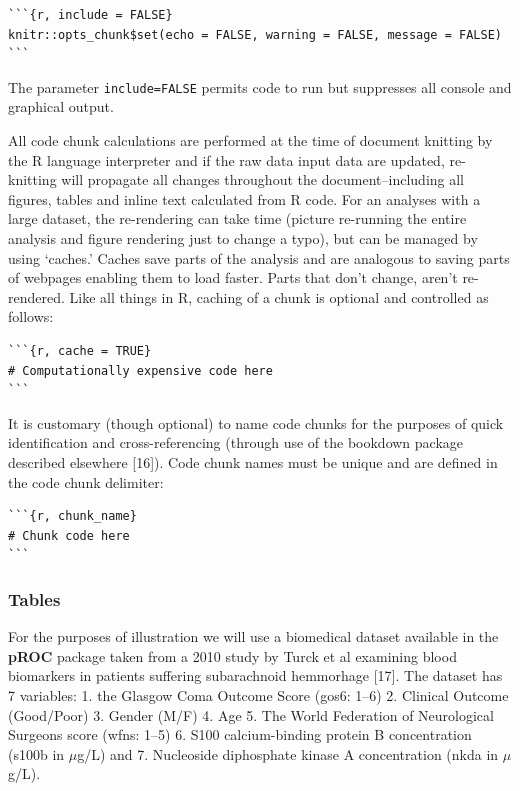 \documentclass[]{elsarticle} %
\begin{document}
\begin{verbatim}
```{r, include = FALSE}
knitr::opts_chunk$set(echo = FALSE, warning = FALSE, message = FALSE)
```
\end{verbatim}

\noindent The parameter \texttt{include=FALSE} permits code to run but
suppresses all console and graphical output.

All code chunk calculations are performed at the time of document
knitting by the R language interpreter and if the raw data input data
are updated, re-knitting will propagate all changes throughout the
document--including all figures, tables and inline text calculated from
R code. For an analyses with a large dataset, the re-rendering can take
time (picture re-running the entire analysis and figure rendering just
to change a typo), but can be managed by using `caches.' Caches save
parts of the analysis and are analogous to saving parts of webpages
enabling them to load faster. Parts that don't change, aren't
re-rendered. Like all things in R, caching of a chunk is optional and
controlled as follows:

\begin{verbatim}
```{r, cache = TRUE} 
# Computationally expensive code here
```
\end{verbatim}

It is customary (though optional) to name code chunks for the purposes
of quick identification and cross-referencing (through use of the
bookdown package described elsewhere {[}16{]}). Code chunk names must be
unique and are defined in the code chunk delimiter:

\begin{verbatim}
```{r, chunk_name} 
# Chunk code here
```
\end{verbatim}

\hypertarget{tables}{%
\subsubsection{Tables}\label{tables}}

For the purposes of illustration we will use a biomedical dataset
available in the \textbf{pROC} package taken from a 2010 study by Turck
et al examining blood biomarkers in patients suffering subarachnoid
hemmorhage {[}17{]}. The dataset has 7 variables: 1. the Glasgow Coma
Outcome Score (gos6: 1--6) 2. Clinical Outcome (Good/Poor) 3. Gender
(M/F) 4. Age 5. The World Federation of Neurological Surgeons score
(wfns: 1--5) 6. S100 calcium-binding protein B concentration (s100b in
\(\mu\)g/L) and 7. Nucleoside diphosphate kinase A concentration (nkda
in \(\mu\)g/L).
\end{document}
